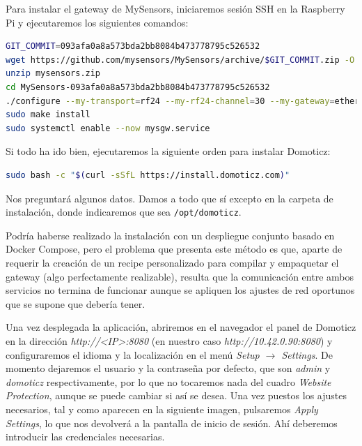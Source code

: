 Para instalar el gateway de MySensors, iniciaremos sesión SSH en la Raspberry
Pi y ejecutaremos los siguientes comandos:

\begin{lstlisting}[language=sh]
GIT_COMMIT=093afa0a8a573bda2bb8084b473778795c526532
wget https://github.com/mysensors/MySensors/archive/$GIT_COMMIT.zip -O mysensors.zip
unzip mysensors.zip
cd MySensors-093afa0a8a573bda2bb8084b473778795c526532
./configure --my-transport=rf24 --my-rf24-channel=30 --my-gateway=ethernet --my-port=5003
sudo make install
sudo systemctl enable --now mysgw.service
\end{lstlisting}

Si todo ha ido bien, ejecutaremos la siguiente orden para instalar Domoticz:

\begin{lstlisting}[language=sh]
sudo bash -c "$(curl -sSfL https://install.domoticz.com)"
\end{lstlisting}

Nos preguntará algunos datos. Damos a todo que sí excepto en la carpeta de
instalación, donde indicaremos que sea \verb|/opt/domoticz|.

Podría haberse realizado la instalación con un despliegue conjunto basado en
Docker Compose, pero el problema que presenta este método es que, aparte de
requerir la creación de un recipe personalizado para compilar y empaquetar el
gateway (algo perfectamente realizable), resulta que la comunicación entre
ambos servicios no termina de funcionar aunque se apliquen los ajustes de red
oportunos que se supone que debería tener.

Una vez desplegada la aplicación, abriremos en el navegador el panel de
Domoticz en la dirección \emph{http://<IP>:8080} (en nuestro caso
\emph{http://10.42.0.90:8080}) y configuraremos el idioma y la localización en
el menú \emph{Setup $\rightarrow$ Settings}. De momento dejaremos el usuario y
la contraseña por defecto, que son \emph{admin} y \emph{domoticz}
respectivamente, por lo que no tocaremos nada del cuadro
\emph{Website Protection}, aunque se puede cambiar si así se desea. Una vez
puestos los ajustes necesarios, tal y como aparecen en la siguiente imagen,
pulsaremos \emph{Apply Settings}, lo que nos devolverá a la pantalla de inicio
de sesión. Ahí deberemos introducir las credenciales necesarias.

